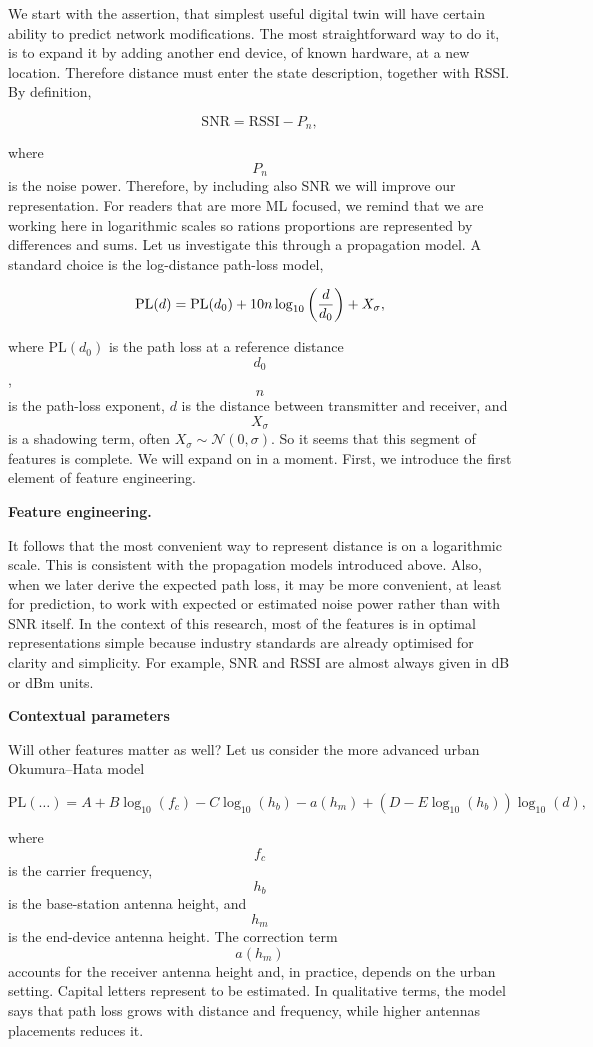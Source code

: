 \documentclass[11pt]{article}
\begin{document}
We start with the assertion, that simplest useful digital twin will have certain ability to predict network modifications. The most straightforward way to do it, is to expand it by adding another end device, of known hardware, at a new location. Therefore distance must enter the state description, together with RSSI. By definition,

$$
\mathrm{SNR} = \mathrm{RSSI} - P_n,
$$

where $$P_n$$ is the noise power. Therefore, by including also SNR we will improve our representation. For readers that are more ML focused, we remind that we are working here in logarithmic scales so rations proportions are represented by differences and sums. Let us investigate this through a propagation model. A standard choice is the log-distance path-loss model,

$$
\def \PL {\mathrm{PL}}
\PL(d) = \PL(d_0) + 10 n \log_{10} \left( \frac{d}{d_0} \right) + X_\sigma,
$$

where \(\mathrm{PL}(d_0)\) is the path loss at a reference distance $$d_0$$, $$n$$ is the path-loss exponent, \(d\) is the distance between transmitter and receiver, and $$X_\sigma$$ is a shadowing term, often \(X_\sigma \sim \mathcal{N}(0, \sigma)\). So it seems that this segment of features is complete. We will expand on in a moment. First, we introduce the first element of feature engineering.

\textbf{Feature engineering.}

It follows that the most convenient way to represent distance is on a logarithmic scale. This is consistent with the propagation models introduced above. Also, when we later derive the expected path loss, it may be more convenient, at least for prediction, to work with expected or estimated noise power rather than with SNR itself. In the context of this research, most of the features is in optimal representations simple because industry standards are already optimised for clarity and simplicity. For example, SNR and RSSI are almost always given in dB or dBm units.

\textbf{Contextual parameters}

Will other features matter as well? Let us consider the more advanced urban Okumura--Hata model

$$
\mathrm{PL}(\ldots) = A + B \log_{10}(f_c) - C \log_{10}(h_b) - a(h_m) + \left(D - E \log_{10}(h_b)\right)\log_{10}(d),
$$

where $$f_c$$ is the carrier frequency, $$h_b$$ is the base-station antenna height, and $$h_m$$ is the end-device antenna height. The correction term $$a(h_m)$$ accounts for the receiver antenna height and, in practice, depends on the urban setting. Capital letters represent to be estimated. In qualitative terms, the model says that path loss grows with distance and frequency, while higher antennas placements reduces it.
\end{document}
